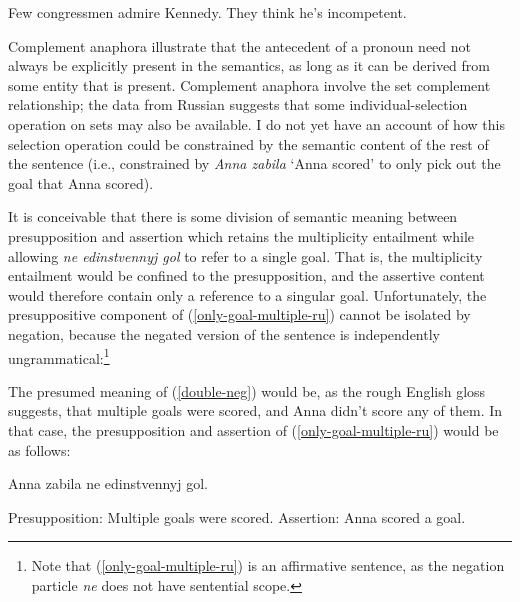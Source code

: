 \documentclass{article}
\begin{document}
\begin{exe}
	\ex \label{kennedy} Few congressmen admire Kennedy. They think he's incompetent.
\end{exe}

Complement anaphora illustrate that the antecedent of a pronoun need not always be explicitly present in the semantics, as long as it can be derived from some entity that is present. Complement anaphora involve the set complement relationship; the data from Russian suggests that some individual-selection operation on sets may also be available. I do not yet have an account of how this selection operation could be constrained by the semantic content of the rest of the sentence (i.e., constrained by \textit{Anna zabila} `Anna scored' to only pick out the goal that Anna scored).

It is conceivable that there is some division of semantic meaning between presupposition and assertion which retains the multiplicity entailment while allowing \textit{ne edinstvennyj gol} to refer to a single goal. That is, the multiplicity entailment would be confined to the presupposition, and the assertive content would therefore contain only a reference to a singular goal. Unfortunately, the presuppositive component of (\ref{only-goal-multiple-ru}) cannot be isolated by negation, because the negated version of the sentence is independently ungrammatical:\footnote{Note that (\ref{only-goal-multiple-ru}) is an affirmative sentence, as the negation particle \textit{ne} does not have sentential scope.}

\begin{exe}
\end{exe}

The presumed meaning of (\ref{double-neg}) would be, as the rough English gloss suggests, that multiple goals were scored, and Anna didn't score any of them. In that case, the presupposition and assertion of (\ref{only-goal-multiple-ru}) would be as follows:

\begin{exe}
	\ex Anna zabila ne edinstvennyj gol. \begin{xlist}
		\ex Presupposition: Multiple goals were scored.
		\ex Assertion: Anna scored a goal.
	\end{xlist}
\end{exe}
\end{document}

